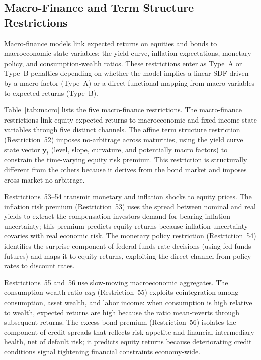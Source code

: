 \subsection{Macro-Finance and Term Structure Restrictions}\label{sub:macro_restrictions}

Macro-finance models link expected returns on equities and bonds to macroeconomic state variables: the yield curve, inflation expectations, monetary policy, and consumption-wealth ratios.
These restrictions enter as Type~A or Type~B penalties depending on whether the model implies a linear SDF driven by a macro factor (Type~A) or a direct functional mapping from macro variables to expected returns (Type~B).

Table~\ref{tab:macro} lists the five macro-finance restrictions. The macro-finance restrictions link equity expected returns to macroeconomic and fixed-income state variables through five distinct channels.
The affine term structure restriction (Restriction~52) imposes no-arbitrage across maturities, using the yield curve state vector $\mathbf{y}_t$ (level, slope, curvature, and potentially macro factors) to constrain the time-varying equity risk premium.
This restriction is structurally different from the others because it derives from the bond market and imposes cross-market no-arbitrage.

Restrictions~53--54 transmit monetary and inflation shocks to equity prices.
The inflation risk premium (Restriction~53) uses the spread between nominal and real yields to extract the compensation investors demand for bearing inflation uncertainty; this premium predicts equity returns because inflation uncertainty covaries with real economic risk.
The monetary policy restriction (Restriction~54) identifies the surprise component of federal funds rate decisions (using fed funds futures) and maps it to equity returns, exploiting the direct channel from policy rates to discount rates.

Restrictions~55 and~56 use slow-moving macroeconomic aggregates.
The consumption-wealth ratio $cay$ (Restriction~55) exploits cointegration among consumption, asset wealth, and labor income: when consumption is high relative to wealth, expected returns are high because the ratio mean-reverts through subsequent returns.
The excess bond premium (Restriction~56) isolates the component of credit spreads that reflects risk appetite and financial intermediary health, net of default risk; it predicts equity returns because deteriorating credit conditions signal tightening financial constraints economy-wide.


